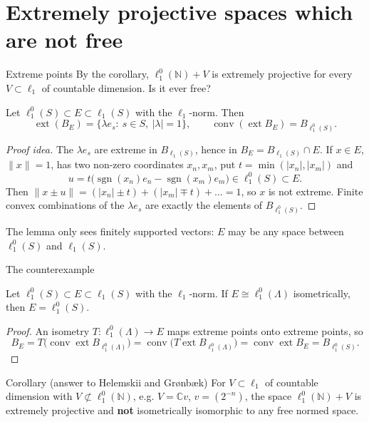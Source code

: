 \documentclass[10pt,aspectratio=169]{beamer}
\newcommand{\lo}[1]{\ell_1^0(#1)}
\newcommand{\ellone}[1]{\ell_1(#1)}
\newcommand{\ext}{\operatorname{ext}}
\newcommand{\conv}{\operatorname{conv}}
\newcommand{\NN}{\mathbb N}
\newcommand{\CC}{\mathbb C}
\begin{document}
\section{Extremely projective spaces which are not free}

\begin{frame}{Extreme points}
  By the corollary, $\lo\NN+V$ is extremely projective for every
  $V\subset\ell_1$ of countable dimension. Is it ever free?
  \begin{lemma}
    Let $\lo S\subset E\subset\ellone S$ with the $\ell_1$-norm. Then
    \[
      \ext(B_E)=\{\lambda e_s:\ s\in S,\ |\lambda|=1\},\qquad
      \conv(\ext B_E)=B_{\lo S}.
    \]
  \end{lemma}
  \begin{proof}[Proof idea]
    The $\lambda e_s$ are extreme in $B_{\ellone S}$, hence in $B_E=B_{\ellone S}\cap E$.
    If $x\in E$, $\|x\|=1$, has two non-zero coordinates $x_n,x_m$, put
    $t=\min(|x_n|,|x_m|)$ and
    \[
      u=t\bigl(\operatorname{sgn}(x_n)e_n-\operatorname{sgn}(x_m)e_m\bigr)\in\lo S\subset E .
    \]
    Then $\|x\pm u\|=(|x_n|\pm t)+(|x_m|\mp t)+\dots=1$, so $x$ is not extreme.
    Finite convex combinations of the $\lambda e_s$ are exactly the elements of
    $B_{\lo S}$.
  \end{proof}
  The lemma only sees finitely supported vectors: $E$ may be any space
  between $\lo S$ and $\ellone S$.
\end{frame}

\begin{frame}{The counterexample}
  \begin{theorem}
    Let $\lo S\subset E\subset\ellone S$ with the $\ell_1$-norm. If
    $E\cong\lo\Lambda$ isometrically, then $E=\lo S$.
  \end{theorem}
  \begin{proof}
    An isometry $T\colon\lo\Lambda\to E$ maps extreme points onto extreme points, so
    \[
      B_E=T\bigl(\conv\ext B_{\lo\Lambda}\bigr)=\conv\bigl(T\ext B_{\lo\Lambda}\bigr)
      =\conv\ext B_E=B_{\lo S}.
    \]
  \end{proof}
  \begin{alertblock}{Corollary (answer to Helemskii and Gr{\o}nb{\ae}k)}
    For $V\subset\ell_1$ of countable dimension with $V\not\subset\lo\NN$,
    e.g. $V=\CC v$, $v=(2^{-n})$, the space $\lo\NN+V$ is extremely projective
    and \textbf{not} isometrically isomorphic to any free normed space.
  \end{alertblock}
\end{frame}
\end{document}
